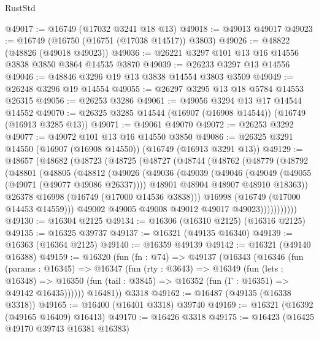 \begin{lexlean}{RustStd}
\begin{coremodule}
@49017 := @16749 (@17032 @3241 @18 @13)
@49018 := @49013 @49017
@49023 := @16749 (@16750 (@16751 (@17038 @14517)) @3803)
@49026 := @48822 (@48826 (@49018 @49023))
@49036 := @26221 @3297 @101 @13 @16 @14556 @3838 @3850 @3864 @14535 @3870
@49039 := @26233 @3297 @13 @14556
@49046 := @48846 @3296 @19 @13 @3838 @14554 @3803 @3509
@49049 := @26248 @3296 @19 @14554
@49055 := @26297 @3295 @13 @18 @5784 @14553 @26315
@49056 := @26253 @3286
@49061 := @49056 @3294 @13 @17 @14544 @14552
@49070 := @26325 @3285 @14544 (@16907 (@16908 @14544)) (@16749 (@16913 @3285 @13))
@49071 := @49061 @49070
@49072 := @26253 @3292
@49077 := @49072 @101 @13 @16 @14550 @3850
@49086 := @26325 @3291 @14550 (@16907 (@16908 @14550)) (@16749 (@16913 @3291 @13))
@49129 := @48657
    (@48682
      (@48723
        (@48725
          (@48727
            (@48744
              (@48762
                (@48779
                  (@48792
                    (@48801
                      (@48805
                        (@48812
                          (@49026
                            (@49036
                              (@49039
                                (@49046
                                  (@49049 (@49055 (@49071 (@49077 @49086 @26337))))
                                  @48901
                                  @48904
                                  @48907
                                  @48910
                                  @18363))
                              @26378
                              @16998
                              (@16749 (@17000 @14536 @3838)))
                            @16998
                            (@16749 (@17000 @14453 @14559)))
                          @49002
                          @49005
                          @49008
                          @49012
                          @49017
                          @49023)))))))))))
@49130 := @16304 @2125
@49134 := @16306 (@16310 @2125) (@16316 @2125)
@49135 := @16325 @39737
@49137 := @16321 (@49135 @16340)
@49139 := @16363 (@16364 @2125)
@49140 := @16359 @49139
@49142 := @16321 (@49140 @16388)
@49159 := @16320
    (fun (fn : @74) =>
    @49137
      (@16343
        (@16346
          (fun (params : @16345) =>
          @16347
            (fun (rty : @3643) =>
            @16349
              (fun (lets : @16348) =>
              @16350 (fun (tail : @3845) => @16352 (fun (Γ : @16351) => @49142 @16435))))))
        @16481))
    @3318
@49162 := @16487 (@49135 (@16338 @3318))
@49165 := @16400 (@16401 @3318) @39740
@49169 := @16321 (@16392 (@49165 @16409) @16413)
@49170 := @16426 @3318
@49175 := @16423 (@16425 @49170 @39743 @16381 @16383)

\end{coremodule}
\end{lexlean}
